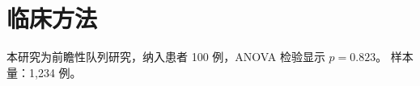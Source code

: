 \documentclass{ctexart}
\begin{document}
\section{临床方法}
本研究为前瞻性队列研究，纳入患者 100 例，ANOVA 检验显示 $p = 0.823$。
样本量：1,234 例。\cite{kohnen2019}
\end{document}
